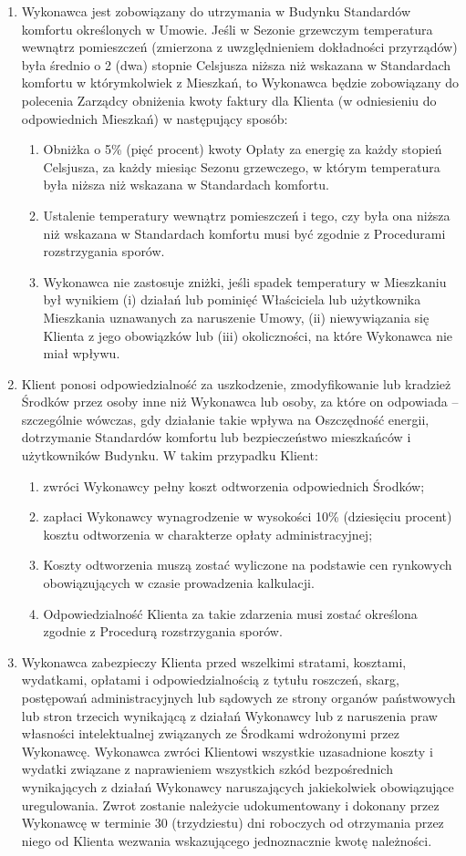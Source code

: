 \begin{multicols}{2}
\begin{enumerate}
	\item Wykonawca jest zobowiązany do utrzymania w Budynku Standardów komfortu określonych w Umowie. Jeśli w Sezonie grzewczym temperatura wewnątrz pomieszczeń (zmierzona z uwzględnieniem dokładności przyrządów) była średnio o 2 (dwa) stopnie Celsjusza niższa niż wskazana w Standardach komfortu w którymkolwiek z Mieszkań, to Wykonawca będzie zobowiązany do polecenia Zarządcy obniżenia kwoty faktury dla Klienta (w odniesieniu do odpowiednich Mieszkań) w następujący sposób:
	\begin{enumerate}
		\item Obniżka o 5\% (pięć procent) kwoty Opłaty za energię za każdy stopień Celsjusza, za każdy miesiąc Sezonu grzewczego, w którym temperatura była niższa niż wskazana w Standardach komfortu.
		\item Ustalenie temperatury wewnątrz pomieszczeń i tego, czy była ona niższa niż wskazana w Standardach komfortu musi być zgodnie z Procedurami rozstrzygania sporów.
		\item Wykonawca nie zastosuje zniżki, jeśli spadek temperatury w Mieszkaniu był wynikiem (i) działań lub pominięć Właściciela lub użytkownika Mieszkania uznawanych za naruszenie Umowy, (ii) niewywiązania się Klienta z jego obowiązków lub (iii) okoliczności, na które Wykonawca nie miał wpływu.
	\end{enumerate}
	\item Klient ponosi odpowiedzialność za uszkodzenie, zmodyfikowanie lub kradzież Środków przez osoby inne niż Wykonawca lub osoby, za które on odpowiada – szczególnie wówczas, gdy działanie takie wpływa na Oszczędność energii, dotrzymanie Standardów komfortu lub bezpieczeństwo mieszkańców i użytkowników Budynku. W takim przypadku Klient:
	\begin{enumerate}
		\item zwróci Wykonawcy pełny koszt odtworzenia odpowiednich Środków;
		\item zapłaci Wykonawcy wynagrodzenie w wysokości 10\% (dziesięciu procent) kosztu odtworzenia w charakterze opłaty administracyjnej;
		\item Koszty odtworzenia muszą zostać wyliczone na podstawie cen rynkowych obowiązujących w czasie prowadzenia kalkulacji.
		\item Odpowiedzialność Klienta za takie zdarzenia musi zostać określona zgodnie z Procedurą rozstrzygania sporów.
	\end{enumerate}
	\item Wykonawca zabezpieczy Klienta przed wszelkimi stratami, kosztami, wydatkami, opłatami i odpowiedzialnością z tytułu roszczeń, skarg, postępowań administracyjnych lub sądowych ze strony organów państwowych lub stron trzecich wynikającą z działań Wykonawcy lub z naruszenia praw własności intelektualnej związanych ze Środkami wdrożonymi przez Wykonawcę. Wykonawca zwróci Klientowi wszystkie uzasadnione koszty i wydatki związane z naprawieniem wszystkich szkód bezpośrednich wynikających z działań Wykonawcy naruszających jakiekolwiek obowiązujące uregulowania. Zwrot zostanie należycie udokumentowany i dokonany przez Wykonawcę w terminie 30 (trzydziestu) dni roboczych od otrzymania przez niego od Klienta wezwania wskazującego jednoznacznie kwotę należności.

\end{enumerate}
\end{multicols}

